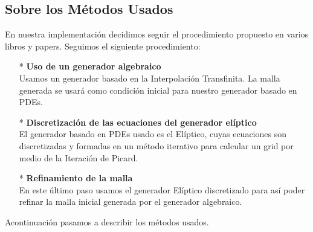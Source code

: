 \documentclass[11pt,letterpaper]{article}
\begin{document}
\subsection{Sobre los Métodos Usados}

	En nuestra implementaci\'on decidimos seguir el procedimiento propuesto en varios libros y papers. Seguimos el 
	siguiente procedimiento: 

	\begin{itemize}
		\item[*] \textbf{ Uso de un generador algebraico }
		\\
		Usamos un generador basado en la Interpolaci\'on Transfinita. La malla generada se usar\'a como condici\'on 
		inicial para nuestro generador basado en PDEs.
		\item[*] \textbf{ Discretizaci\'on de las ecuaciones del generador el\'iptico }
		\\
		El generador basado en PDEs usado es el El\'iptico, cuyas ecuaciones son discretizadas y formadas en un 
		m\'etodo iterativo para calcular un grid por medio de la Iteraci\'on de Picard.
		\item[*] \textbf{ Refinamiento de la malla }
		\\ En este \'ultimo paso usamos el generador El\'iptico discretizado para as\'i poder refinar la malla
		inicial generada por el generador algebraico.
	\end{itemize}

	Acontinuaci\'on pasamos a describir los m\'etodos usados.
\end{document}
